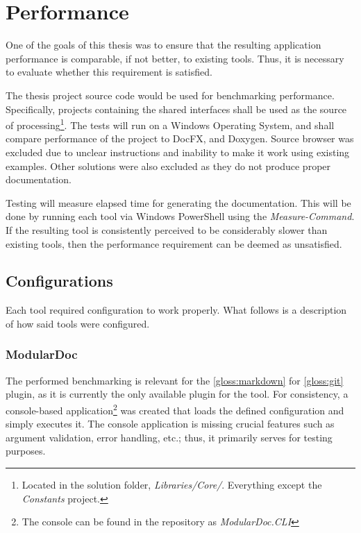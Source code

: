 \chapter{Performance}

One of the goals of this thesis was to ensure that the resulting application performance is comparable, if not better, to existing tools. Thus, it is necessary to evaluate whether this requirement is satisfied.

The thesis project source code would be used for benchmarking performance.
Specifically, projects containing the shared interfaces shall be used as the source of processing\footnote{Located in the solution folder, \textit{Libraries/Core/}. Everything except the \textit{Constants} project.}.
The tests will run on a Windows Operating System, and shall compare performance of the project to DocFX, and Doxygen. Source browser was excluded due to unclear instructions and inability to make it work using existing examples. Other solutions were also excluded as they do not produce proper documentation.

Testing will measure elapsed time for generating the documentation. This will be done by running each tool via Windows PowerShell using the \textit{Measure-Command}. If the resulting tool is consistently perceived to be considerably slower than existing tools, then the performance requirement can be deemed as unsatisfied.

\section{Configurations}

Each tool required configuration to work properly. What follows is a description of how said tools were configured.

\subsection{ModularDoc}

The performed benchmarking is relevant for the \ref{gloss:markdown} for \ref{gloss:git} plugin, as it is currently the only available plugin for the tool.
For consistency, a console-based application\footnote{The console can be found in the repository as \textit{ModularDoc.CLI}} was created that loads the defined configuration and simply executes it.
The console application is missing crucial features such as argument validation, error handling, etc.; thus, it primarily serves for testing purposes.

